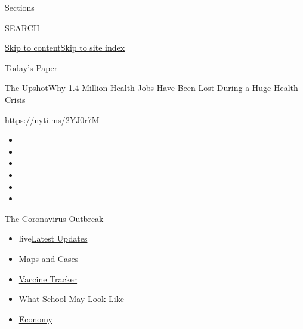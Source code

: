 Sections

SEARCH

\protect\hyperlink{site-content}{Skip to
content}\protect\hyperlink{site-index}{Skip to site index}

\href{https://myaccount.nytimes3xbfgragh.onion/auth/login?response_type=cookie\&client_id=vi}{}

\href{https://www.nytimes3xbfgragh.onion/section/todayspaper}{Today's
Paper}

\href{/section/upshot}{The Upshot}\textbar{}Why 1.4 Million Health Jobs
Have Been Lost During a Huge Health Crisis

\url{https://nyti.ms/2YJ0r7M}

\begin{itemize}
\item
\item
\item
\item
\item
\item
\end{itemize}

\href{https://www.nytimes3xbfgragh.onion/news-event/coronavirus?action=click\&pgtype=Article\&state=default\&region=TOP_BANNER\&context=storylines_menu}{The
Coronavirus Outbreak}

\begin{itemize}
\tightlist
\item
  live\href{https://www.nytimes3xbfgragh.onion/2020/08/01/world/coronavirus-covid-19.html?action=click\&pgtype=Article\&state=default\&region=TOP_BANNER\&context=storylines_menu}{Latest
  Updates}
\item
  \href{https://www.nytimes3xbfgragh.onion/interactive/2020/us/coronavirus-us-cases.html?action=click\&pgtype=Article\&state=default\&region=TOP_BANNER\&context=storylines_menu}{Maps
  and Cases}
\item
  \href{https://www.nytimes3xbfgragh.onion/interactive/2020/science/coronavirus-vaccine-tracker.html?action=click\&pgtype=Article\&state=default\&region=TOP_BANNER\&context=storylines_menu}{Vaccine
  Tracker}
\item
  \href{https://www.nytimes3xbfgragh.onion/interactive/2020/07/29/us/schools-reopening-coronavirus.html?action=click\&pgtype=Article\&state=default\&region=TOP_BANNER\&context=storylines_menu}{What
  School May Look Like}
\item
  \href{https://www.nytimes3xbfgragh.onion/live/2020/07/31/business/stock-market-today-coronavirus?action=click\&pgtype=Article\&state=default\&region=TOP_BANNER\&context=storylines_menu}{Economy}
\end{itemize}


